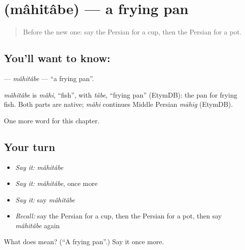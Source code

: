 \section[\texorpdfstring{\fa{ماهیتابه} (mâhitâbe)}{ماهیتابه (mâhitâbe)}]{ (mâhitâbe) — a frying pan}

\label{lesson:FA-C95-mahitabe}



\begin{quote}
Before the new one: say the Persian for a cup, then the Persian for a pot.
\end{quote}

\subsection*{You'll want to know: }
\textbf{} — \emph{mâhitâbe} — \textquotedblleft{}a frying pan\textquotedblright{}.

\begin{cousinweb}
\emph{mâhitâbe} is \emph{mâhi}, \textquotedblleft{}fish\textquotedblright{}, with \emph{tâbe}, \textquotedblleft{}frying pan\textquotedblright{} (EtymDB): the pan for frying fish. Both parts are native; \emph{mâhi} continues Middle Persian \emph{māhīg} (EtymDB).
\end{cousinweb}

\begin{grammarlens}[title={What you've built}]
One more word for this chapter.
\end{grammarlens}

\subsection*{Your turn}
\begin{itemize}
\raggedright
  \item \emph{Say it:} \emph{mâhitâbe}
  \item \emph{Say it:} \emph{mâhitâbe}, once more
  \item \emph{Say it:} say \emph{mâhitâbe}
  \item \emph{Recall:} say the Persian for a cup, then the Persian for a pot, then say \emph{mâhitâbe} again
\end{itemize}

\begin{tcolorbox}[breakable,colback=teal!4,colframe=teal!35!black,title={Before you move on}]
What does  mean? (\textquotedblleft{}A frying pan\textquotedblright{}.) Say it once more.
\end{tcolorbox}
